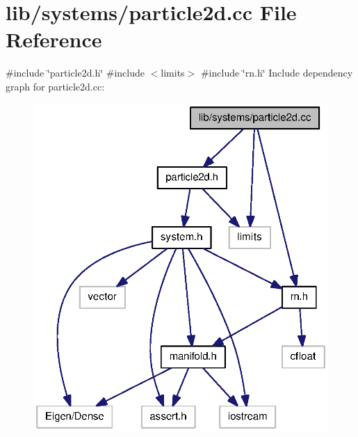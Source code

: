 \section{lib/systems/particle2d.cc \-File \-Reference}
\label{particle2d_8cc}
{\ttfamily \#include \char`\"{}particle2d.\-h\char`\"{}}\*
{\ttfamily \#include $<$limits$>$}\*
{\ttfamily \#include \char`\"{}rn.\-h\char`\"{}}\*
\-Include dependency graph for particle2d.\-cc\-:
\nopagebreak
\begin{figure}[H]
\begin{center}
\leavevmode
\includegraphics[width=322pt]{particle2d_8cc__incl}
\end{center}
\end{figure}
